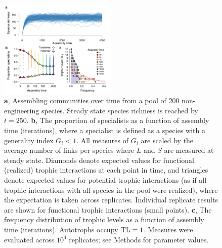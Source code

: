 \documentclass[twocolumn,preprintnumbers,amsmath,amssymb,superscriptaddress,linenumbers]{revtex4-1}
\begin{document}
\vspace{0mm}
\begin{figure}[h!]
\centering
\includegraphics[width=0.5\textwidth]{fig_trophic3.pdf}
\vspace{0mm}
\caption{
\textbf{a}, Assembling communities over time from a pool of 200 non-engineering species. 
Steady state species richness is reached by $t=250$.
\textbf{b}, The proportion of specialists as a function of assembly time (iterations), where a specialist is defined as a species with a generality index $G_i < 1$.
All measures of $G_i$ are scaled by the average number of links per species where $L$ and $S$ are measured at steady state.
Diamonds denote expected values for functional (realized) trophic interactions at each point in time, and triangles denote expected values for potential trophic interactions (as if all trophic interactions with all species in the pool were realized), where the expectation is taken across replicates. Individual replicate results are shown for functional trophic interactions (small points).
\textbf{c}, The frequency distribution of trophic levels as a function of assembly time (iterations). 
Autotrophs occupy ${\rm TL}=1$.
Measures were evaluated across $10^4$ replicates; see Methods for parameter values.
\vspace{0mm}
}
\label{fig:trophic}
\end{figure}
\end{document}
